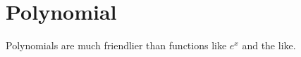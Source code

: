 \documentclass{scrreprt}
\begin{document}
\section*{Polynomial}

Polynomials are much friendlier than functions like $e^x$ and the like.
\end{document}
